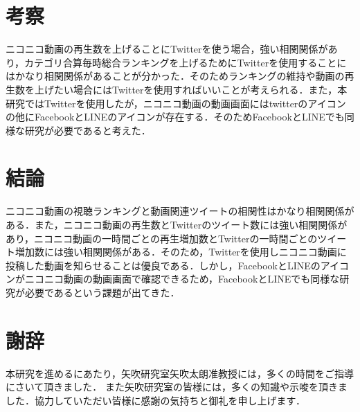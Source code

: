 \chapter{考察}
ニコニコ動画の再生数を上げることにTwitterを使う場合，強い相関関係があり，カテゴリ合算毎時総合ランキングを上げるためにTwitterを使用することにはかなり相関関係があることが分かった．そのためランキングの維持や動画の再生数を上げたい場合にはTwitterを使用すればいいことが考えられる．また，本研究ではTwitterを使用したが，ニコニコ動画の動画画面にはtwitterのアイコンの他にFacebookとLINEのアイコンが存在する．そのためFacebookとLINEでも同様な研究が必要であると考えた．
\chapter{結論}
ニコニコ動画の視聴ランキングと動画関連ツイートの相関性はかなり相関関係がある．また，ニコニコ動画の再生数とTwitterのツイート数には強い相関関係があり，ニコニコ動画の一時間ごとの再生増加数とTwitterの一時間ごとのツイート増加数には強い相関関係がある．そのため，Twitterを使用しニコニコ動画に投稿した動画を知らせることは優良である．しかし，FacebookとLINEのアイコンがニコニコ動画の動画画面で確認できるため，FacebookとLINEでも同様な研究が必要であるという課題が出てきた．






\chapter*{謝辞}

本研究を進めるにあたり，矢吹研究室矢吹太朗准教授には，多くの時間をご指導にさいて頂きました．
また矢吹研究室の皆様には，多くの知識や示唆を頂きました．協力していただい皆様に感謝の気持ちと御礼を申し上げます．


